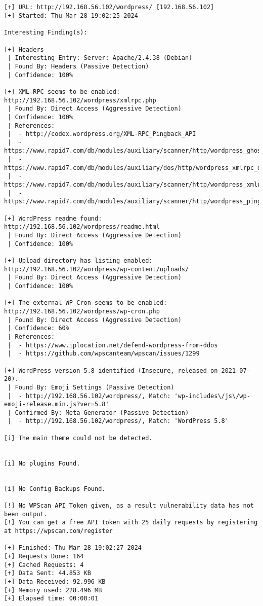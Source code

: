 \begin{verbatim}


[+] URL: http://192.168.56.102/wordpress/ [192.168.56.102]
[+] Started: Thu Mar 28 19:02:25 2024

Interesting Finding(s):

[+] Headers
 | Interesting Entry: Server: Apache/2.4.38 (Debian)
 | Found By: Headers (Passive Detection)
 | Confidence: 100%

[+] XML-RPC seems to be enabled: http://192.168.56.102/wordpress/xmlrpc.php
 | Found By: Direct Access (Aggressive Detection)
 | Confidence: 100%
 | References:
 |  - http://codex.wordpress.org/XML-RPC_Pingback_API
 |  - https://www.rapid7.com/db/modules/auxiliary/scanner/http/wordpress_ghost_scanner/
 |  - https://www.rapid7.com/db/modules/auxiliary/dos/http/wordpress_xmlrpc_dos/
 |  - https://www.rapid7.com/db/modules/auxiliary/scanner/http/wordpress_xmlrpc_login/
 |  - https://www.rapid7.com/db/modules/auxiliary/scanner/http/wordpress_pingback_access/

[+] WordPress readme found: http://192.168.56.102/wordpress/readme.html
 | Found By: Direct Access (Aggressive Detection)
 | Confidence: 100%

[+] Upload directory has listing enabled: http://192.168.56.102/wordpress/wp-content/uploads/
 | Found By: Direct Access (Aggressive Detection)
 | Confidence: 100%

[+] The external WP-Cron seems to be enabled: http://192.168.56.102/wordpress/wp-cron.php
 | Found By: Direct Access (Aggressive Detection)
 | Confidence: 60%
 | References:
 |  - https://www.iplocation.net/defend-wordpress-from-ddos
 |  - https://github.com/wpscanteam/wpscan/issues/1299

[+] WordPress version 5.8 identified (Insecure, released on 2021-07-20).
 | Found By: Emoji Settings (Passive Detection)
 |  - http://192.168.56.102/wordpress/, Match: 'wp-includes\/js\/wp-emoji-release.min.js?ver=5.8'
 | Confirmed By: Meta Generator (Passive Detection)
 |  - http://192.168.56.102/wordpress/, Match: 'WordPress 5.8'

[i] The main theme could not be detected.


[i] No plugins Found.


[i] No Config Backups Found.

[!] No WPScan API Token given, as a result vulnerability data has not been output.
[!] You can get a free API token with 25 daily requests by registering at https://wpscan.com/register

[+] Finished: Thu Mar 28 19:02:27 2024
[+] Requests Done: 164
[+] Cached Requests: 4
[+] Data Sent: 44.853 KB
[+] Data Received: 92.996 KB
[+] Memory used: 228.496 MB
[+] Elapsed time: 00:00:01


\end{verbatim}